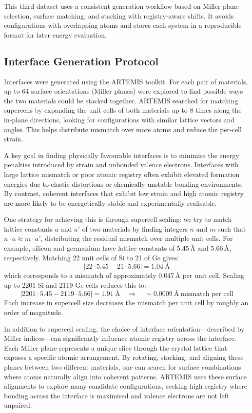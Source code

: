 This third dataset uses a consistent generation workflow based on Miller plane selection, surface matching, and stacking with registry-aware shifts. It avoids configurations with overlapping atoms and stores each system in a reproducible format for later energy evaluation.

\subsection{Interface Generation Protocol}

Interfaces were generated using the ARTEMIS toolkit. For each pair of materials, up to 64 surface orientations (Miller planes) were explored to find possible ways the two materials could be stacked together. ARTEMIS searched for matching supercells by expanding the unit cells of both materials up to 8 times along the in-plane directions, looking for configurations with similar lattice vectors and angles. This helps distribute mismatch over more atoms and reduce the per-cell strain.

A key goal in finding physically favourable interfaces is to minimise the energy penalties introduced by strain and unbonded valence electrons. Interfaces with large lattice mismatch or poor atomic registry often exhibit elevated formation energies due to elastic distortions or chemically unstable bonding environments. By contrast, coherent interfaces that exhibit low strain and high atomic registry are more likely to be energetically stable and experimentally realisable.

One strategy for achieving this is through supercell scaling: we try to match lattice constants $a$ and $a'$ of two materials by finding integers $n$ and $m$ such that $n \cdot a \approx m \cdot a'$, distributing the residual mismatch over multiple unit cells. For example, silicon and germanium have lattice constants of 5.45\,\AA{} and 5.66\,\AA{}, respectively. Matching 22 unit cells of Si to 21 of Ge gives:
\[
|22 \cdot 5.45 - 21 \cdot 5.66| = 1.04~\text{\AA}
\]
which corresponds to a mismatch of approximately 0.047\,\AA{} per unit cell. Scaling up to 2201 Si and 2119 Ge cells reduces this to:
\[
|2201 \cdot 5.45 - 2119 \cdot 5.66| = 1.91~\text{\AA} \quad \Rightarrow \quad \sim 0.0009~\text{\AA}~\text{mismatch per cell}
\]
Each increase in supercell size decreases the mismatch per unit cell by roughly an order of magnitude.

In addition to supercell scaling, the choice of interface orientation—described by Miller indices—can significantly influence atomic registry across the interface. Each Miller plane represents a unique slice through the crystal lattice that exposes a specific atomic arrangement. By rotating, stacking, and aligning these planes between two different materials, one can search for surface combinations where atoms naturally align into coherent patterns. ARTEMIS uses these surface alignments to explore many candidate configurations, seeking high registry where bonding across the interface is maximised and valence electrons are not left unpaired.

